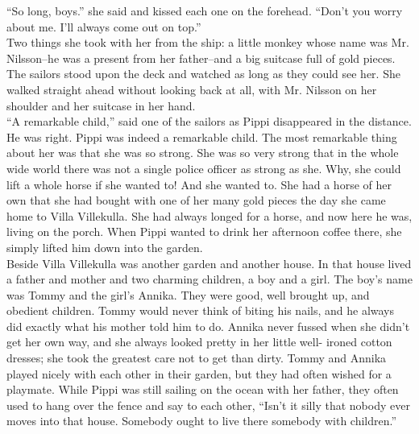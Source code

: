 \documentclass{standard}
\begin{document}
``So long, boys.” she said and kissed each one on the forehead. ``Don’t you worry about me. I’ll always come out on top.”\\

Two things she took with her from the ship: a little monkey whose name was Mr. Nilsson--he was a present from her father--and a big suitcase full of gold pieces. The sailors stood upon the deck and watched as long as they could see her. She walked straight ahead without looking back at all, with Mr. Nilsson on her shoulder and her suitcase in her hand.\\

``A remarkable child,” said one of the sailors as Pippi disappeared in the distance.\\

He was right. Pippi was indeed a remarkable child. The most remarkable thing about her was that she was so strong. She was so very strong that in the whole wide world there was not a single police officer as strong as she. Why, she could lift a whole horse if she wanted to! And she wanted to. She had a horse of her own that she had bought with one of her many gold pieces the day she came home to Villa Villekulla. She had always longed for a horse, and now here he was, living on the porch. When Pippi wanted to drink her afternoon coffee there, she simply lifted him down into the garden.\\

Beside Villa Villekulla was another garden and another house. In that house lived a father and mother and two charming children, a boy and a girl. The boy’s name was Tommy and the girl’s Annika. They were good, well brought up, and obedient children. Tommy would never think of biting his nails, and he always did exactly what his mother told him to do. Annika never fussed when she didn’t get her own way, and she always looked pretty in her little well- ironed cotton dresses; she took the greatest care not to get than dirty. Tommy and Annika played nicely with each other in their garden, but they had often wished for a playmate. While Pippi was still sailing on the ocean with her father, they often used to hang over the fence and say to each other, ``Isn’t it silly that nobody ever moves into that house. Somebody ought to live there somebody with children.”\\
\end{document}
